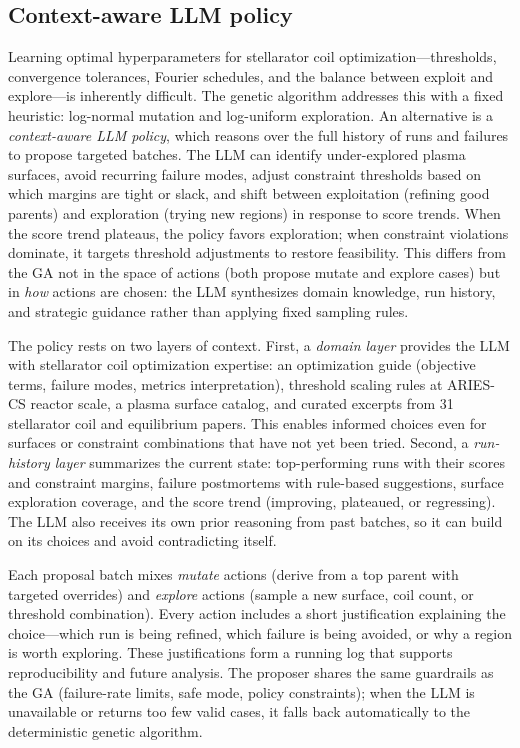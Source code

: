 %

\subsection{Context-aware LLM policy}

Learning optimal hyperparameters for stellarator coil optimization---thresholds, convergence tolerances, Fourier schedules, and the balance between exploit and explore---is inherently difficult.
The genetic algorithm addresses this with a fixed heuristic: log-normal mutation and log-uniform exploration.
An alternative is a \emph{context-aware LLM policy}, which reasons over the full history of runs and failures to propose targeted batches.
The LLM can identify under-explored plasma surfaces, avoid recurring failure modes, adjust constraint thresholds based on which margins are tight or slack, and shift between exploitation (refining good parents) and exploration (trying new regions) in response to score trends.
When the score trend plateaus, the policy favors exploration; when constraint violations dominate, it targets threshold adjustments to restore feasibility.
This differs from the GA not in the space of actions (both propose mutate and explore cases) but in \emph{how} actions are chosen: the LLM synthesizes domain knowledge, run history, and strategic guidance rather than applying fixed sampling rules.

The policy rests on two layers of context.
First, a \emph{domain layer} provides the LLM with stellarator coil optimization expertise: an optimization guide (objective terms, failure modes, metrics interpretation), threshold scaling rules at ARIES-CS reactor scale, a plasma surface catalog, and curated excerpts from 31 stellarator coil and equilibrium papers.
This enables informed choices even for surfaces or constraint combinations that have not yet been tried.
Second, a \emph{run-history layer} summarizes the current state: top-performing runs with their scores and constraint margins, failure postmortems with rule-based suggestions, surface exploration coverage, and the score trend (improving, plateaued, or regressing).
The LLM also receives its own prior reasoning from past batches, so it can build on its choices and avoid contradicting itself.

Each proposal batch mixes \emph{mutate} actions (derive from a top parent with targeted overrides) and \emph{explore} actions (sample a new surface, coil count, or threshold combination).
Every action includes a short justification explaining the choice---which run is being refined, which failure is being avoided, or why a region is worth exploring.
These justifications form a running log that supports reproducibility and future analysis.
The proposer shares the same guardrails as the GA (failure-rate limits, safe mode, policy constraints); when the LLM is unavailable or returns too few valid cases, it falls back automatically to the deterministic genetic algorithm.
